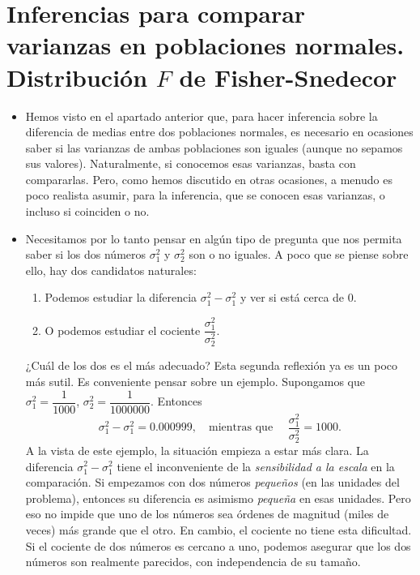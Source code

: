 \section{Inferencias para comparar varianzas en poblaciones normales. Distribución $F$ de Fisher-Snedecor}

\begin{itemize}

    \item Hemos visto en el apartado anterior que, para hacer inferencia sobre la diferencia de medias entre dos poblaciones normales, es necesario en ocasiones saber si las varianzas de ambas poblaciones son iguales (aunque no sepamos sus valores). Naturalmente, si conocemos esas varianzas, basta con compararlas. Pero, como hemos discutido en otras ocasiones, a menudo es poco realista asumir, para la inferencia, que se conocen esas varianzas, o incluso si coinciden o no.

    \item Necesitamos por lo tanto pensar en algún tipo de pregunta que nos permita saber si los dos números $\sigma_1^2$ y $\sigma_2^2$ son o no iguales. A poco que se piense sobre ello, hay dos candidatos naturales:
        \begin{enumerate}
        \item Podemos estudiar la diferencia $\sigma_1^2-\sigma_1^2$ y ver si está cerca de $0$.
        \item O podemos estudiar el cociente $\dfrac{\sigma_1^2}{\sigma_2^2}$.
        \end{enumerate}
        ¿Cuál de los dos es el más adecuado? Esta segunda reflexión ya es un poco más sutil. Es conveniente pensar sobre un ejemplo. Supongamos que $\sigma_1^2=\dfrac{1}{1000}$, $\sigma_2^2=\dfrac{1}{1000000}$. Entonces
        \[\sigma_1^2-\sigma_1^2=0.000999,\quad\mbox{mientras que }\quad\dfrac{\sigma_1^2}{\sigma_2^2}=1000.\]
        A la vista de este ejemplo, la situación empieza a estar más clara. La diferencia  $\sigma_1^2-\sigma_1^2$ tiene el inconveniente de la {\em sensibilidad a la escala} en la comparación. Si empezamos con dos números {\em pequeños} (en las unidades del problema), entonces su diferencia es asimismo {\em pequeña} en esas unidades. Pero eso no impide que uno de los números sea órdenes de magnitud (miles de veces) más grande que el otro. En cambio, el cociente no tiene esta dificultad. Si el cociente de dos números es cercano a uno, podemos asegurar que los dos números son realmente parecidos, con independencia de su tamaño.


\end{itemize}
